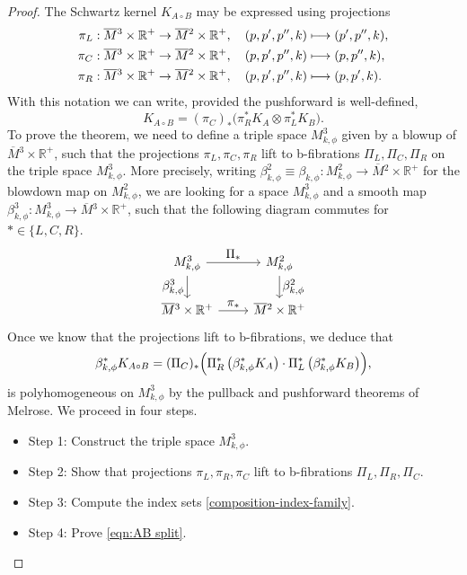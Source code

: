 \documentclass[JEP,XML,SOM,Unicode,NoFloatCountersInSection,published]{cedram}
\newcommand\mto{\mathchoice{\longmapsto}{\mapsto}{\mapsto}{\mapsto}}
\let\ts\textstyle
\theoremstyle{plain}
\theoremstyle{definition}
\newcommand{\R}{{\mathbb{R}}}
\newcommand{\Mbar}{{\overline{M}}}\let\M\Mbar
\begin{document}
\begin{proof}
The Schwartz kernel $K_{A \circ B}$ may be expressed using projections
\begin{align*}
\pi_{L} &:\Mbar{}^3\times \R^+ \to \Mbar{}^2\times \R^+, \quad (p,p',p'',k) \mto (p',p'',k),\\
\pi_{C} &:\Mbar{}^3\times \R^+ \to \Mbar{}^2\times \R^+, \quad (p,p',p'',k) \mto (p,p'',k),\\
\pi_{R} &:\Mbar{}^3\times \R^+ \to \Mbar{}^2\times \R^+, \quad (p,p',p'',k) \mto (p,p',k).
\end{align*}
With this notation we can write, provided the pushforward is well-defined,
\[
K_{A \circ B} = (\pi_{C})_{*} \bigl(\pi_{R}^{*}K_{A}\otimes \pi_{L}^{*}K_{B} \bigr).
\]
To prove the theorem, we need to define a triple space $M^{3}_{k,\phi}$ given by a blowup of $\Mbar{}^3\times \R^+$,
such that the projections $\pi_{L}, \pi_{C}, \pi_{R}$ lift to b-fibrations
$\Pi_{L}, \Pi_{C}, \Pi_{R}$ on the triple space $M^{3}_{k,\phi}$. More precisely,
writing $\beta_{k,\phi}^2 \equiv \beta_{k,\phi}: M^{2}_{k,\phi} \to \Mbar{}^2 \times \R^+$ for the blowdown map on $M^{2}_{k,\phi}$,
we are looking for a space $M^{3}_{k,\phi}$ and a smooth map
$\beta_{k,\phi}^3: M^{3}_{k,\phi} \to \Mbar{}^3\times \R^+$,
such that the following diagram commutes for $* \in \{ L,C,R\}$.
\[
\begin{tikzcd} M^{3}_{k,\phi}\arrow[r, "\ts\Pi_{*}" ]\arrow["\ts\beta^{3}_{k,\phi}"',d]& M^{2}_{k,\phi}
\arrow[d, "\ts\beta^{2}_{k,\phi}"] \\\Mbar{}^3\times \R^+
\arrow[r, "\ts\pi_{*}"]& \Mbar{}^2\times \R^+
\end{tikzcd}
\]
Once we know that the projections lift to b-fibrations, we deduce that
\begin{equation}
\label{eqn:composition phi formula}
\beta_{k,\phi}^* K_{A \circ B} = (\Pi_{C})_{*} \Bigl(\Pi_{R}^{*} \left(\beta_{k,\phi}^* K_{A} \right) \cdot
\Pi_{L}^{*} \left(\beta_{k,\phi}^* K_{B}\right) \Bigr),
\end{equation}
is polyhomogeneous on $M^{3}_{k,\phi}$ by the pullback and pushforward theorems of Melrose.
We proceed in four steps.

\begin{itemize}
\item Step 1: Construct the triple space $M^{3}_{k,\phi}$.
\item Step 2: Show that projections $\pi_{L}, \pi_{R}, \pi_{C}$
lift to b-fibrations $\Pi_{L}, \Pi_{R}, \Pi_{C}$.
\item Step 3: Compute the index sets \eqref{composition-index-family}.
\item Step 4: Prove \eqref{eqn:AB split}.
\end{itemize}


\end{proof}
\end{document}
